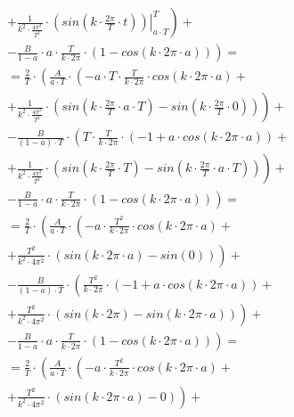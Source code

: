 \begin{task}
\begin{align*}
&+ \left. \left. \frac{1}{k^2 \cdot \frac{4\pi^2}{T^2}} \cdot \left. \left(sin\left( k \cdot \frac{2\pi}{T} \cdot t\right) \right)\right|_{a \cdot T}^{T}  \right)\right. +\\
&-\left. \frac{B}{1-a}\cdot a \cdot \frac{T}{k \cdot 2\pi} \cdot \left(1 - cos\left(k \cdot 2\pi \cdot a\right) \right)\right)=\\
&=\frac{2}{T}\cdot\left( \frac{A}{a \cdot T} \cdot \left( - a\cdot T \cdot \frac{T}{k \cdot 2\pi} \cdot cos\left( k \cdot 2\pi \cdot a\right) \right.\right.+ \\
&+ \left. \left. \frac{1}{k^2 \cdot \frac{4\pi^2}{T^2}} \cdot \left(sin\left(k \cdot \frac{2\pi}{T} \cdot a\cdot T\right) - sin\left(k \cdot \frac{2\pi}{T} \cdot 0\right)\right) \right) \right. + \\
&-\left.\frac{B}{\left(1-a\right)\cdot T}\cdot \left(T \cdot \frac{T}{k \cdot 2\pi} \cdot \left( -1 + a \cdot cos\left( k \cdot 2\pi \cdot a \right)\right) \right. \right.+ \\
&+ \left. \left. \frac{1}{k^2 \cdot \frac{4\pi^2}{T^2}} \cdot \left(sin\left( k \cdot \frac{2\pi}{T} \cdot T\right) - sin\left( k \cdot \frac{2\pi}{T} \cdot a \cdot T\right)\right) \right)\right. +\\
&-\left. \frac{B}{1-a}\cdot a \cdot \frac{T}{k \cdot 2\pi} \cdot \left(1 - cos\left(k \cdot 2\pi \cdot a\right) \right)\right)=\\
&=\frac{2}{T}\cdot\left( \frac{A}{a \cdot T} \cdot \left( - a\cdot \frac{T^2}{k \cdot 2\pi} \cdot cos\left( k \cdot 2\pi \cdot a\right) \right.\right.+ \\
&+ \left. \left. \frac{T^2}{k^2 \cdot 4\pi^2} \cdot \left(sin\left(k \cdot 2\pi \cdot a\right) - sin\left(0\right)\right) \right) \right. + \\
&-\left.\frac{B}{\left(1-a\right)\cdot T}\cdot \left( \frac{T^2}{k \cdot 2\pi} \cdot \left( -1 + a \cdot cos\left( k \cdot 2\pi \cdot a \right)\right) \right. \right.+ \\
&+ \left. \left. \frac{T^2}{k^2 \cdot 4\pi^2} \cdot \left(sin\left( k \cdot 2\pi\right) - sin\left( k \cdot 2\pi \cdot a\right)\right) \right)\right. +\\
&-\left. \frac{B}{1-a}\cdot a \cdot \frac{T}{k \cdot 2\pi} \cdot \left(1 - cos\left(k \cdot 2\pi \cdot a\right) \right)\right)=\\
&=\frac{2}{T}\cdot\left( \frac{A}{a \cdot T} \cdot \left( - a\cdot \frac{T^2}{k \cdot 2\pi} \cdot cos\left( k \cdot 2\pi \cdot a\right) \right.\right.+ \\
&+ \left. \left. \frac{T^2}{k^2 \cdot 4\pi^2} \cdot \left(sin\left(k \cdot 2\pi \cdot a\right) - 0\right) \right) \right. + \\

\end{align*}
\end{task}

